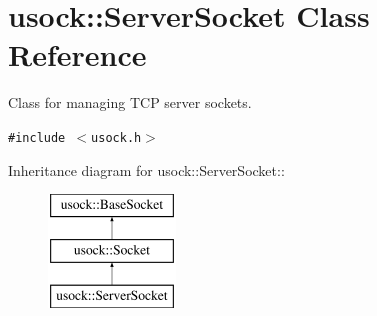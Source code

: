 \hypertarget{classusock_1_1ServerSocket}{
\section{usock::ServerSocket Class Reference}
\label{classusock_1_1ServerSocket}
}
Class for managing TCP server sockets.  


{\tt \#include $<$usock.h$>$}

Inheritance diagram for usock::ServerSocket::\begin{figure}[H]
\begin{center}
\leavevmode
\includegraphics[height=3cm]{classusock_1_1ServerSocket}
\end{center}
\end{figure}
